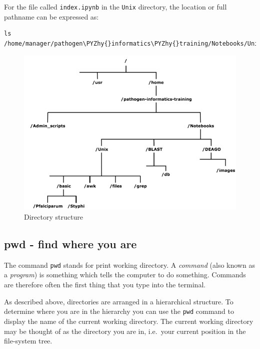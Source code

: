 \documentclass[11pt]{article}
\makeatletter
\def\PYZhy{\char`\-}
\newcommand{\boxspacing}{\kern\kvtcb@left@rule\kern\kvtcb@boxsep}
\newcommand{\prompt}[4]{
       \ttfamily\llap{{\color{#2}\LARGE\faKeyboardO\hspace{3pt}#4}}\vspace{-\baselineskip}
    }
\makeatother
\begin{document}
For the file called \texttt{index.ipynb} in the \texttt{Unix} directory,
the location or full pathname can be expressed as:

    \begin{tcolorbox}[breakable, size=fbox, boxrule=1pt, pad at break*=1mm,colback=cellbackground, colframe=cellborder]
\prompt{In}{incolor}{ }{\boxspacing}
\begin{Verbatim}[commandchars=\\\{\}]
ls /home/manager/pathogen\PYZhy{}informatics\PYZhy{}training/Notebooks/Unix/index.ipynb
\end{Verbatim}
\end{tcolorbox}

    \begin{figure}[!h]
\centering
\includegraphics{basic/directory_structure.png}
\caption{Directory structure}
\end{figure}

    \hypertarget{pwd---find-where-you-are}{%
\subsection{pwd - find where you are}\label{pwd---find-where-you-are}}

The command \texttt{pwd} stands for print working directory. A
\textit{command} (also known as a \textit{program}) is something which tells
the computer to do something. Commands are therefore often the first
thing that you type into the terminal.

As described above, directories are arranged in a hierarchical
structure. To determine where you are in the hierarchy you can use the
\texttt{pwd} command to display the name of the current working
directory. The current working directory may be thought of as the
directory you are in, i.e.~your current position in the file-system
tree.
\end{document}
